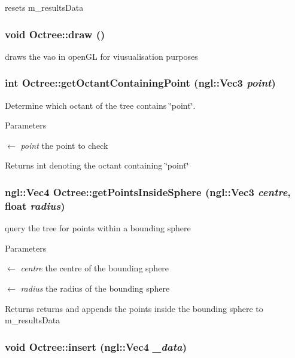 resets m\_\-resultsData \hypertarget{classOctree_ab49e14a7f8dd7c2f87c16098d5c602a3}{
\subsubsection[{draw}]{\setlength{\rightskip}{0pt plus 5cm}void Octree::draw ()}}
\label{classOctree_ab49e14a7f8dd7c2f87c16098d5c602a3}


draws the vao in openGL for viusualisation purposes \hypertarget{classOctree_adb4be848e01fce3568b83cd8a4117e26}{
\subsubsection[{getOctantContainingPoint}]{\setlength{\rightskip}{0pt plus 5cm}int Octree::getOctantContainingPoint (ngl::Vec3 {\em point})}}
\label{classOctree_adb4be848e01fce3568b83cd8a4117e26}


Determine which octant of the tree contains \char`\"{}point\char`\"{}. 
\begin{DoxyParams}{Parameters}
\item[\mbox{$\leftarrow$} {\em point}]the point to check \end{DoxyParams}
\begin{DoxyReturn}{Returns}
int denoting the octant containing \char`\"{}point\char`\"{} 
\end{DoxyReturn}
\hypertarget{classOctree_a814ed4196b414829c44f55c8b65a7517}{
\subsubsection[{getPointsInsideSphere}]{\setlength{\rightskip}{0pt plus 5cm}ngl::Vec4 Octree::getPointsInsideSphere (ngl::Vec3 {\em centre}, \/  float {\em radius})}}
\label{classOctree_a814ed4196b414829c44f55c8b65a7517}


query the tree for points within a bounding sphere 
\begin{DoxyParams}{Parameters}
\item[\mbox{$\leftarrow$} {\em centre}]the centre of the bounding sphere \item[\mbox{$\leftarrow$} {\em radius}]the radius of the bounding sphere \end{DoxyParams}
\begin{DoxyReturn}{Returns}
returns and appends the points inside the bounding sphere to m\_\-resultsData 
\end{DoxyReturn}
\hypertarget{classOctree_a9a1092104eeea9725e66ae188b8db736}{
\subsubsection[{insert}]{\setlength{\rightskip}{0pt plus 5cm}void Octree::insert (ngl::Vec4 {\em \_\-data})}}
\label{classOctree_a9a1092104eeea9725e66ae188b8db736}


